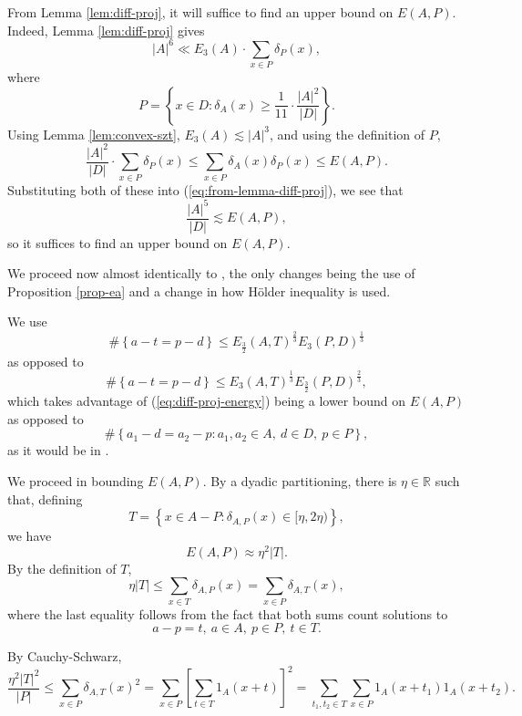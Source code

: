 \documentclass[reqno]{amsart}
\numberwithin{equation}{section}
\begin{document}
From Lemma \ref{lem:diff-proj}, it will suffice to find an upper bound on \(E(A,P)\).
Indeed, Lemma \ref{lem:diff-proj} gives
\begin{equation} \label{eq:from-lemma-diff-proj}
    \left\lvert A \right\rvert ^{6} \ll E_3(A) \cdot \sum _{x \in P} \delta_{P} (x),
\end{equation}
where
\[
    P = \left\{ x \in D : \delta_{A} (x) \geq \frac{1}{11} \cdot \frac{\left\lvert A \right\rvert ^{2}}{\left\lvert D \right\rvert }  \right\} 
.\]
Using Lemma \ref{lem:convex-szt}, \(E_3(A) \lesssim \left\lvert A \right\rvert ^{3} \), and using the definition of \(P\),
\[
    \frac{\left\lvert A \right\rvert ^{2}}{\left\lvert D \right\rvert } \cdot \sum _{x \in P} \delta_{P} (x) \leq \sum _{x \in P} \delta_{A} (x) \delta_{P} (x) \leq E(A,P)
.\]
Substituting both of these into (\ref{eq:from-lemma-diff-proj}), we see that
\begin{equation} \label{eq:diff-proj-energy}
    \frac{\left\lvert A \right\rvert ^{5}}{\left\lvert D \right\rvert } \lesssim E(A,P),
\end{equation}
so it suffices to find an upper bound on \(E(A,P)\).

We proceed now almost identically to \cite{bloom}, the only changes being the use of 
Proposition \ref{prop-ea} and a change in how 
H\"older inequality is used. 

We use
\[
    \# \left\{ a - t = p - d \right\} \leq E_{\frac{3}{2} } (A,T) ^{\frac{2}{3} }E_3(P,D)^{\frac{1}{3} }
\]
as opposed to
\[
    \# \left\{ a - t = p - d \right\} \leq E_{3 } (A,T)^{\frac{1}{3} } E_{\frac{3}{2} } (P,D)^{\frac{2}{3} }
,\]
which takes advantage of (\ref{eq:diff-proj-energy}) being a lower bound on \(E(A,P)\) as opposed to 
\[
    \# \left\{ a_1 - d = a_2 - p : a_1,a_2 \in A ,~ d \in D,~ p \in P \right\}
,\]
as it would be in \cite{bloom}.

We proceed in bounding \(E(A,P)\).
By a dyadic partitioning, there is \(\eta \in \mathbb{R} \) such that, defining
\[
    T = \left\{ x \in A  - P : \delta_{A,P} (x) \in [\eta,2\eta) \right\} 
,\]
we have
\[
    E(A,P)\approx \eta ^{2}\left\lvert T \right\rvert 
.\]
By the definition of \(T\),
\[
    \eta \left\lvert T  \right\rvert \leq \sum _{x \in T } \delta_{A,P} (x) = \sum _{x \in P} \delta_{A,T } (x)  
,\]
where the last equality follows from the fact that both sums count solutions to
\[
     a - p = t ,~ a \in A,~ p \in P ,~ t \in T
.\]

By Cauchy-Schwarz,
\[
    \frac{\eta^{2} \left\lvert T \right\rvert ^{2}}{\left\lvert P \right\rvert  }  \leq \sum _{x \in P} \delta_{A,T } (x)^{2} = \sum _{x \in P} \left[ \sum _{t \in T } 1_{A} (x + t) \right] ^{2} = \sum _{t_1,t_2 \in T} \sum _{x \in P} 1_{A} (x + t_1) 1_{A} (x + t_2)   
.\]
\end{document}
